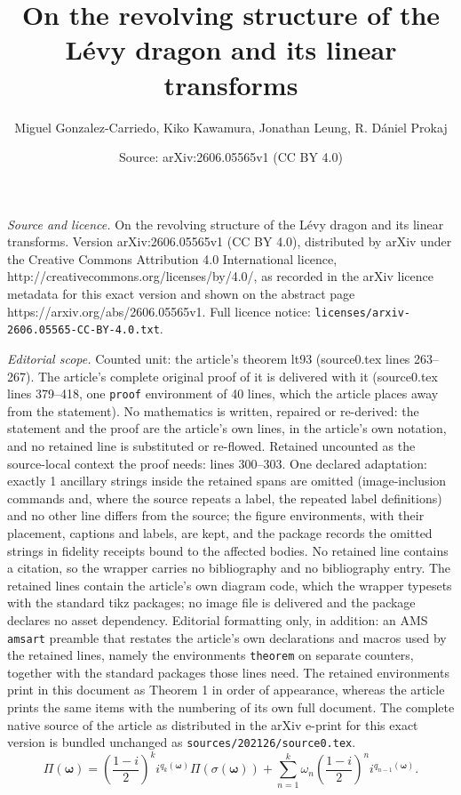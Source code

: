\documentclass[10pt,a4paper]{amsart}
\title{On the revolving structure of the L\'evy dragon and its linear transforms}
\author{Miguel Gonzalez-Carriedo, Kiko Kawamura, Jonathan Leung, R. D\'aniel Prokaj}
\date{Source: arXiv:2606.05565v1 (CC BY 4.0)}
\begin{document}
\maketitle

\noindent\emph{Source and licence.} On the revolving structure of the L\'evy dragon and its linear transforms. Version arXiv:2606.05565v1 (CC BY 4.0), distributed by arXiv under the Creative Commons Attribution 4.0 International licence, http://creativecommons.org/licenses/by/4.0/, as recorded in the arXiv licence metadata for this exact version and shown on the abstract page https://arxiv.org/abs/2606.05565v1. Full licence notice: \texttt{licenses/arxiv-2606.05565-CC-BY-4.0.txt}.\par\smallskip

\noindent\textit{Editorial scope.} Counted unit: the article's theorem lt93 (source0.tex lines 263--267). The article's complete original proof of it is delivered with it (source0.tex lines 379--418, one \texttt{proof} environment of 40 lines, which the article places away from the statement). No mathematics is written, repaired or re-derived: the statement and the proof are the article's own lines, in the article's own notation, and no retained line is substituted or re-flowed.  Retained uncounted as the source-local context the proof needs: lines 300--303.  One declared adaptation: exactly 1 ancillary strings inside the retained spans are omitted (image-inclusion commands and, where the source repeats a label, the repeated label definitions) and no other line differs from the source; the figure environments, with their placement, captions and labels, are kept, and the package records the omitted strings in fidelity receipts bound to the affected bodies.  No retained line contains a citation, so the wrapper carries no bibliography and no bibliography entry.  The retained lines contain the article's own diagram code, which the wrapper typesets with the standard tikz packages; no image file is delivered and the package declares no asset dependency.  Editorial formatting only, in addition: an AMS \texttt{amsart} preamble that restates the article's own declarations and macros used by the retained lines, namely the environments \texttt{theorem} on separate counters, together with the standard packages those lines need.  The retained environments print in this document as Theorem 1 in order of appearance, whereas the article prints the same items with the numbering of its own full document.  The complete native source of the article as distributed in the arXiv e-print for this exact version is bundled unchanged as \texttt{sources/202126/source0.tex}.
\begin{equation}\label{lt98}
    \Pi(\pmb{\omega})=\left(\frac{1-i}{2}\right)^k i^{q_k(\pmb{\omega})} \Pi(\sigma(\pmb{\omega})) +
    \sum_{n=1}^{k}\omega_n\left(\frac{1-i}{2}\right)^n i^{q_{n-1}(\pmb{\omega})}.
\end{equation}
\end{document}
